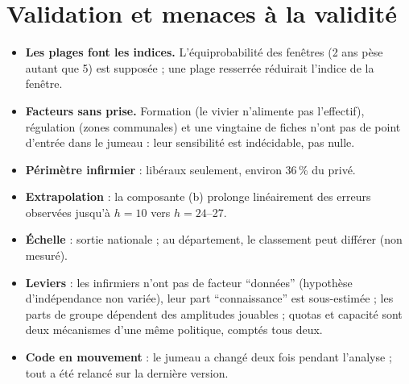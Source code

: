 \section{Validation et menaces à la validité}
\begin{itemize}
  \item \textbf{Les plages font les indices.} L'équiprobabilité des fenêtres (2 ans pèse autant que 5) est
        supposée ; une plage resserrée réduirait l'indice de la fenêtre.
  \item \textbf{Facteurs sans prise.} Formation (le vivier n'alimente pas l'effectif), régulation (zones
        communales) et une vingtaine de fiches n'ont pas de point d'entrée dans le jumeau : leur sensibilité est
        indécidable, pas nulle.
  \item \textbf{Périmètre infirmier} : libéraux seulement, environ 36\,\%\derive{} du privé.
  \item \textbf{Extrapolation} : la composante (b) prolonge linéairement des erreurs observées jusqu'à $h = 10$
        vers $h = 24$--27.
  \item \textbf{Échelle} : sortie nationale ; au département, le classement peut différer (non mesuré).
  \item \textbf{Leviers} : les infirmiers n'ont pas de facteur \enquote{données} (hypothèse d'indépendance non variée),
        leur part \enquote{connaissance} est sous-estimée ; les parts de groupe dépendent des amplitudes jouables ;
        quotas et capacité sont deux mécanismes d'une même politique, comptés tous deux.
  \item \textbf{Code en mouvement} : le jumeau a changé deux fois pendant l'analyse ; tout a été relancé sur la
        dernière version.
\end{itemize}

